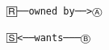 \documentclass[varwidth,crop]{standalone}
\begin{document}
\begin{verbatim}
🅁──owned by──>Ⓐ

🅂<──wants───Ⓑ
\end{verbatim}
\end{document}
